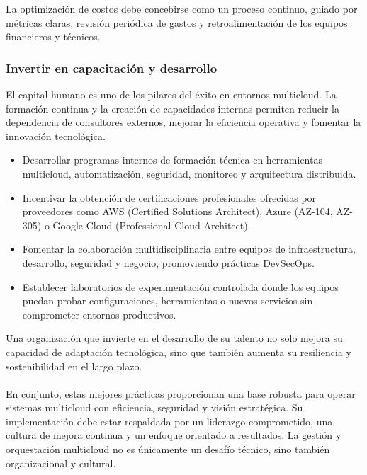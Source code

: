 {                La optimización de costos debe concebirse como un proceso continuo, guiado por métricas claras, revisión periódica de gastos y retroalimentación de los equipos financieros y técnicos.
                
            \subsubsection{Invertir en capacitación y desarrollo}
                El capital humano es uno de los pilares del éxito en entornos multicloud. La formación continua y la creación de capacidades internas permiten reducir la dependencia de consultores externos, mejorar la eficiencia operativa y fomentar la innovación tecnológica.
                
                \begin{itemize}
                    \item Desarrollar programas internos de formación técnica en herramientas multicloud, automatización, seguridad, monitoreo y arquitectura distribuida.
                    \item Incentivar la obtención de certificaciones profesionales ofrecidas por proveedores como AWS (Certified Solutions Architect), Azure (AZ-104, AZ-305) o Google Cloud (Professional Cloud Architect).
                    \item Fomentar la colaboración multidisciplinaria entre equipos de infraestructura, desarrollo, seguridad y negocio, promoviendo prácticas DevSecOps.
                    \item Establecer laboratorios de experimentación controlada donde los equipos puedan probar configuraciones, herramientas o nuevos servicios sin comprometer entornos productivos.
                \end{itemize}
                
                Una organización que invierte en el desarrollo de su talento no solo mejora su capacidad de adaptación tecnológica, sino que también aumenta su resiliencia y sostenibilidad en el largo plazo.
                
                \paragraph{}En conjunto, estas mejores prácticas proporcionan una base robusta para operar sistemas multicloud con eficiencia, seguridad y visión estratégica. Su implementación debe estar respaldada por un liderazgo comprometido, una cultura de mejora continua y un enfoque orientado a resultados. La gestión y orquestación multicloud no es únicamente un desafío técnico, sino también organizacional y cultural.

}
